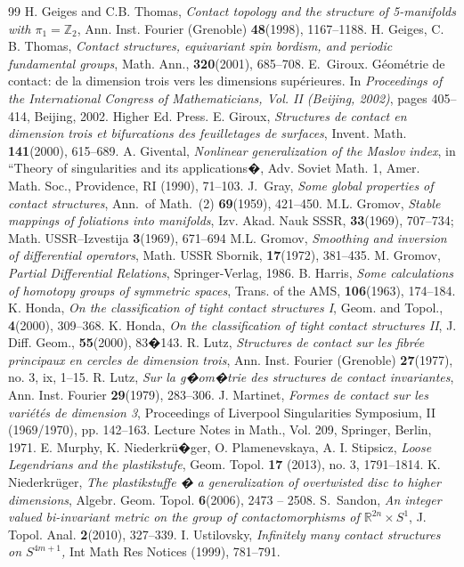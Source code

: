 \documentclass[12pt]{paper}
\theoremstyle{plain}
\theoremstyle{definition}
\newcommand{\Z}{{\mathbb{Z}}}
\newcommand{\R}{{\mathbb{R}}}
\numberwithin{figure}{section}
\begin{document}
\begin{thebibliography}{99}
 H. Geiges and C.B. Thomas, {\em Contact topology and the structure of 5-manifolds with $\pi_1=\Z_2$}, Ann. Inst.
Fourier (Grenoble) {\bf 48}(1998), 1167--1188.
 H. Geiges, C. B. Thomas, {\em Contact structures, equivariant spin bordism, and periodic fundamental
groups}, Math. Ann., {\bf 320}(2001), 685--708.
 E.~Giroux. G{\'e}om{\'e}trie de contact: de la dimension trois vers les dimensions sup{\'e}rieures. 
In {\em Proceedings of the {I}nternational {C}ongress of 
{M}athematicians, {V}ol. {II} ({B}eijing, 2002)}, pages 405--414, Beijing, 2002. Higher Ed. Press.
 E. Giroux, {\em Structures de contact en dimension trois et bifurcations des feuilletages de surfaces}, Invent. Math. {\bf 141}(2000), 615--689.
 A. Givental, {\em  Nonlinear generalization of the Maslov index}, in ``Theory of singularities and its applications�, Adv. Soviet Math. 1, Amer. Math. Soc., Providence, RI (1990),  71--103.
 J.~Gray, {\em Some global properties of contact structures},
Ann.~of Math.~(2) {\bf 69}(1959), 421--450.
 M.L. Gromov,  {\em Stable mappings of foliations into manifolds}, Izv. Akad. Nauk SSSR, {\bf 33}(1969), 707--734; Math. USSR--Izvestija   {\bf 3}(1969), 671--694
 M.L. Gromov,
{\em Smoothing and inversion of differential operators},
Math. USSR Sbornik, {\bf 17}(1972), 381--435.
  M. Gromov, \emph{Partial Differential Relations}, Springer-Verlag, 1986.
 B. Harris, {\em Some calculations of homotopy groups of symmetric spaces},
Trans. of the AMS, {\bf 106}(1963), 174--184.
 K. Honda, {\em On the classification of tight contact structures I}, Geom. and Topol., {\bf 4}(2000), 309--368.
 K. Honda, {\em On the classification of tight contact structures II}, J. Diff. Geom., {\bf 55}(2000), 83�143.
   R. Lutz, {\em  Structures de contact sur les fibr\'ee principaux en cercles de dimension trois}, Ann. Inst. Fourier (Grenoble) {\bf 27}(1977), no. 3, ix, 1--15. 
   R. Lutz, {\em Sur la g�om�trie des structures de contact invariantes}, Ann. Inst. Fourier {\bf 29}(1979), 283--306.
  J. Martinet, {\em  Formes de contact sur les vari\'et\'es de dimension 3}, Proceedings of Liverpool Singularities Symposium, II (1969/1970), pp. 142--163. Lecture Notes in Math., Vol. 209, Springer, Berlin, 1971. 
  E. Murphy, K. Niederkr\"u�ger, O. Plamenevskaya, A. I. Stipsicz, {\em Loose Legendrians and the plastikstufe}, 
Geom. Topol. {\bf 17} (2013), no. 3, 1791--1814.
  K. Niederkr\"uger, {\em The plastikstuffe � a generalization of overtwisted disc to higher dimensions},  Algebr.
Geom. Topol. {\bf 6}(2006), 2473 -- 2508.
 S.~Sandon, {\em An integer valued bi-invariant metric on the group of contactomorphisms of $\R^{2n} \times S^1$},  J. Topol. Anal. 
{\bf 2}(2010), 327--339.
 I. Ustilovsky,  {\em Infinitely many contact structures on
 $S^{4m + 1}$,} Int Math Res Notices (1999),  781--791.
 
     \end{thebibliography}






  
\end{document}
